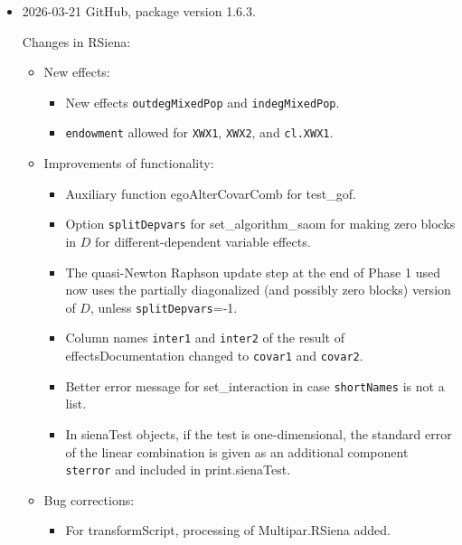 \documentclass[a4paper,fleqn,11pt]{article}
\newcommand{\+}{\, + \,}
\newcommand{\sfn}[1]{\textsf{#1}}
\begin{document}
\begin{small}
\begin{itemize}
Changes in RSiena:
\begin{itemize}
\item Bug corrections:
  \begin{itemize}
    \item For \sfn{test\_gof}, a bug in the handling
      of auxiliary functions was fixed.
  \end{itemize}
\end{itemize}

\item 2026-03-21 GitHub, package version 1.6.3.

Changes in RSiena:
\begin{itemize}
\item New effects:
   \begin{itemize}
  \item New effects \texttt{outdegMixedPop} and \texttt{indegMixedPop}.
  \item \texttt{endowment} allowed for \texttt{XWX1}, \texttt{XWX2}, and \texttt{cl.XWX1}.
    \end{itemize}
\item Improvements of functionality:
   \begin{itemize}
  \item Auxiliary function \sfn{egoAlterCovarComb} for \sfn{test\_gof}.
  \item Option \texttt{splitDepvars} for \sfn{set\_algorithm\_saom}
    for making zero blocks in $D$ for different-dependent variable
    effects.
  \item The quasi-Newton Raphson update step at the end of Phase 1 used
    now uses the partially diagonalized (and possibly zero blocks) version of $D$,
    unless \texttt{splitDepvars}=-1.
  \item Column names \texttt{inter1} and \texttt{inter2} of the result of \sfn{effectsDocumentation}
    changed to \texttt{covar1} and \texttt{covar2}.
  \item Better error message for \sfn{set\_interaction} in case \texttt{shortNames}
    is not a list.
  \item In \sfn{sienaTest} objects, if the test is one-dimensional, the standard error
    of the linear combination is given as an additional component \texttt{sterror}
    and included in \sfn{print.sienaTest}.
    \end{itemize}
\item Bug corrections:
   \begin{itemize}
  \item For \sfn{transformScript}, processing of \sfn{Multipar.RSiena} added.

\end{itemize}
\end{itemize}
\end{itemize}
\end{small}
\end{document}
